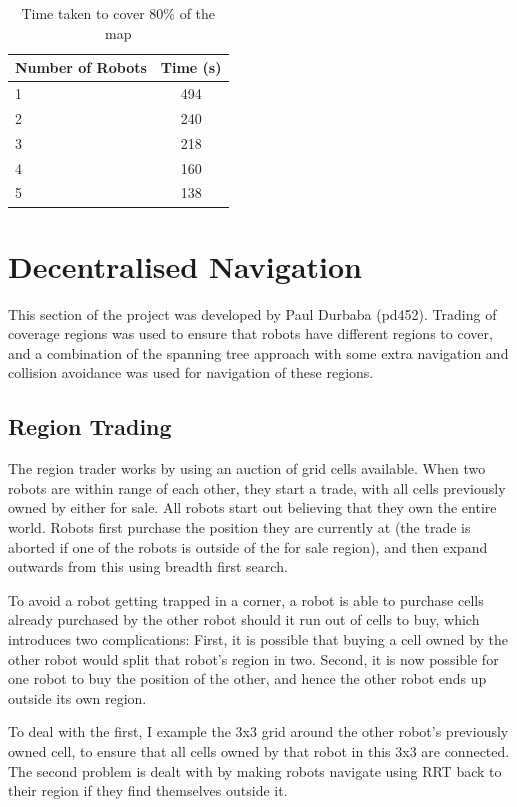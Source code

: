 \documentclass[a4paper, 10pt, conference]{ieeeconf}      %
\begin{document}
\begin{table}[h!]
  \begin{center}
    \caption{Time taken to cover 80\% of the map}
    \label{tab:table1}
    \begin{tabular}{|l|c|}
      \hline
      \textbf{Number of Robots} & \textbf{Time (s)} \\
      \hline
      1 & 494\\
      2 & 240\\
      3 & 218\\
      4 & 160\\
      5 & 138\\
      \hline
    \end{tabular}
  \end{center}
\end{table}


\section{Decentralised Navigation}
This section of the project was developed by Paul Durbaba (pd452). Trading of coverage regions was used to ensure that robots have different regions to cover, and a combination of the spanning tree approach with some extra navigation and collision avoidance was used for navigation of these regions.

\subsection{Region Trading}
The region trader works by using an auction of grid cells available. When two robots are within range of each other, they start a trade, with all cells previously owned by either for sale. All robots start out believing that they own the entire world. Robots first purchase the position they are currently at (the trade is aborted if one of the robots is outside of the for sale region), and then expand outwards from this using breadth first search.

To avoid a robot getting trapped in a corner, a robot is able to purchase cells already purchased by the other robot should it run out of cells to buy, which introduces two complications: First, it is possible that buying a cell owned by the other robot would split that robot's region in two. Second, it is now possible for one robot to buy the position of the other, and hence the other robot ends up outside its own region.

To deal with the first, I example the 3x3 grid around the other robot's previously owned cell, to ensure that all cells owned by that robot in this 3x3 are connected. The second problem is dealt with by making robots navigate using RRT back to their region if they find themselves outside it.
\end{document}
